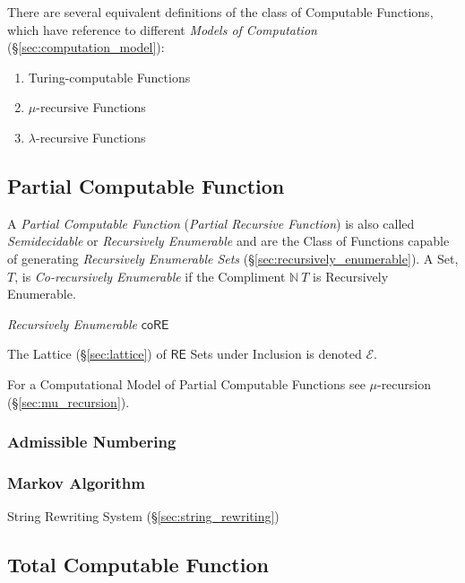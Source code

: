 There are several equivalent definitions of the class of Computable
Functions, which have reference to different \emph{Models of
  Computation} (\S\ref{sec:computation_model}):
\begin{enumerate}
\item Turing-computable Functions
\item $\mu$-recursive Functions
\item $\lambda$-recursive Functions
\end{enumerate}



\subsection{Partial Computable Function}\label{sec:partial_computable}

A \emph{Partial Computable Function} (\emph{Partial Recursive
  Function}) is also called \emph{Semidecidable} or \emph{Recursively
  Enumerable} and are the Class of Functions capable of generating
\emph{Recursively Enumerable Sets}
(\S\ref{sec:recursively_enumerable}). A Set, $T$, is
\emph{Co-recursively Enumerable} if the Compliment $\mathbb{N} \ T$ is
Recursively Enumerable.

\emph{Recursively Enumerable} $\mathsf{coRE}$

The Lattice (\S\ref{sec:lattice}) of $\mathsf{RE}$ Sets under
Inclusion is denoted $\mathcal{E}$.

For a Computational Model of Partial Computable Functions see
$\mu$-recursion (\S\ref{sec:mu_recursion}).



\subsubsection{Admissible Numbering}\label{sec:admissible_numbering}

\subsubsection{Markov Algorithm}\label{sec:markov_algorithm}

String Rewriting System (\S\ref{sec:string_rewriting})



\subsection{Total Computable Function}\label{sec:total_computable}

